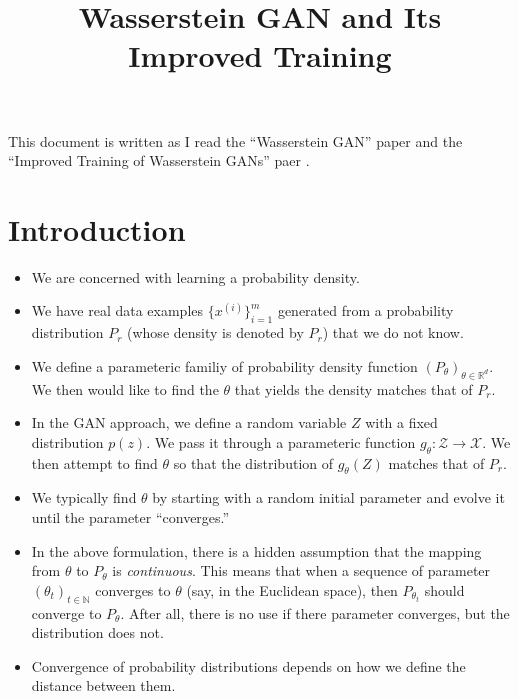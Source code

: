\documentclass[10pt]{article}
\title{Wasserstein GAN and Its Improved Training}
\begin{document}
  \maketitle

  This document is written as I read the ``Wasserstein GAN'' paper \cite{Arjovsky:2017} and the ``Improved Training of Wasserstein GANs'' paer \cite{Gulrajani:2017}.

  \section{Introduction}

  \begin{itemize}
  	\item We are concerned with learning a probability density.

  	\item We have real data examples $\{ x^{(i)} \}_{i=1}^m$ generated from a probability distribution $P_r$ (whose density is denoted by $P_r$) that we do not know.

  	\item We define a parameteric familiy of probability density function $(P_\theta)_{\theta \in \mathbb{R}^d}$. We then would like to find the $\theta$ that yields the density matches that of $P_r$.

  	\item In the GAN approach, we define a random variable $Z$ with a fixed distribution $p(z)$. We pass it through a parameteric function $g_\theta: \mathcal{Z} \rightarrow \mathcal{X}$. We then attempt to find $\theta$ so that the distribution of $g_\theta(Z)$ matches that of $P_r$.

  	\item We typically find $\theta$ by starting with a random initial parameter and evolve it until the parameter ``converges.''

  	\item In the above formulation, there is a hidden assumption that the mapping from $\theta$ to $P_\theta$ is \emph{continuous}. This means that when a sequence of parameter $(\theta_t)_{t \in \mathbb{N}}$ converges to $\theta$ (say, in the Euclidean space), then $P_{\theta_t}$ should converge to $P_\theta$. After all, there is no use if there parameter converges, but the distribution does not.

  	\item Convergence of probability distributions depends on how we define the distance between them.


\end{itemize}
\end{document}

